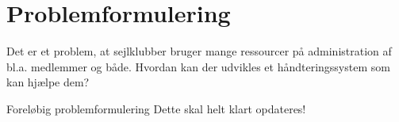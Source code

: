 \chapter{Problemformulering}\label{chap:problemformulering}

\cbstart

Det er et problem, at sejlklubber bruger mange ressourcer på administration af bl.a. medlemmer og både.
Hvordan kan der udvikles et håndteringssystem som kan hjælpe dem?

\begin{anfxnote}{Foreløbig problemformulering}
  Dette skal helt klart opdateres!
\end{anfxnote}

\cbend
